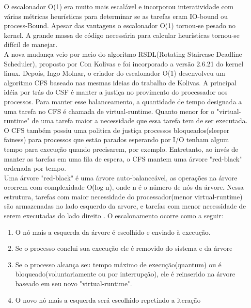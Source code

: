 \documentclass[conference]{IEEEtran}
\begin{document}
 O escalonador O(1) era muito mais escalável e incorporou interatividade com várias métricas heurísticas para determinar se as tarefas eram IO-bound ou process-Bound. Apesar das vantagens o escalonador O(1) tornou-se pesado no kernel. A grande massa de código necessária para calcular heurísticas tornou-se difícil de manejar.\\

 A nova mudança veio por meio do algoritmo RSDL(Rotating Staircase Deadline Scheduler), proposto por Con Kolivas e foi incorporado a versão 2.6.21 do kernel linux. Depois, Ingo Molnar, o criador do escalonador O(1) desenvolveu um algoritmo CFS baseado nas mesmas ideias do trabalho de Kolivas. A principal idéia por trás do CSF é manter a justiça no provimento do processador aos processos. Para manter esse balanceamento, a quantidade de tempo designada a uma tarefa no CFS é chamada de virtual-runtime. Quanto menor for o "virtual-runtime" de uma tarefa maior a necessidade que essa tarefa tem de ser executada.\\
 
O CFS também possiu uma politica de justiça processos bloqueados(sleeper fainess) para processos que estão parados esperando por I/O tenham algum tempo para execução quando precisarem, por exemplo. Entretanto, ao invés de manter as tarefas em uma fila de espera, o CFS mantem uma árvore "red-black" ordenada por tempo.\\

Uma árvore "red-black" é uma árvore auto-balanceável, as operações na árvore ocorrem com complexidade O(log n), onde n é o número de nós da árvore. Nessa estrutura, tarefas com maior necessidade do processador(menor virtual-runtime) são armazenadas no lado esquerdo da arvore, e tarefas com menor necessidade de serem executadas do lado direito \cite{LinuxSchedulerIBM}. O escalonamento ocorre como a seguir:
\begin{enumerate}
	\item O nó mais a esquerda da árvore é escolhido e enviado à execução.
	\item Se o processo conclui sua execução ele é removido do sistema e da árvore
	\item Se o processo alcança seu tempo máximo de execução(quantum) ou é bloqueado(voluntariamente ou por interrupção), ele é reinserido na árvore baseado em seu novo "virtual-runtime".
	\item O novo nó mais a esquerda será escolhido repetindo a iteração\cite{LinuxSchedulerWiki}
\end{enumerate}
\end{document}

